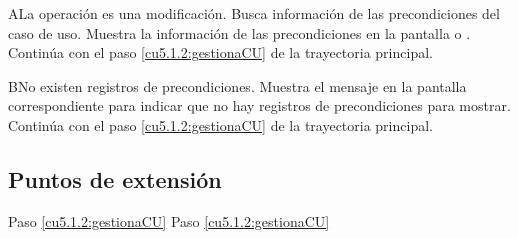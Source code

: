  \begin{UCtrayectoriaA}{A}{La operación es una modificación.}
    \UCpaso[\UCsist] Busca información de las precondiciones del caso de uso. 
    \UCpaso[\UCsist] Muestra la información de las precondiciones en la pantalla  o . 
    \UCpaso[] Continúa con el paso \ref{cu5.1.2:gestionaCU} de la trayectoria principal.
 \end{UCtrayectoriaA}
 
 \begin{UCtrayectoriaA}{B}{No existen registros de precondiciones.}
    \UCpaso[\UCsist] Muestra el mensaje  en la pantalla correspondiente
    para indicar que no hay registros de precondiciones para mostrar.
    \UCpaso[] Continúa con el paso \ref{cu5.1.2:gestionaCU} de la trayectoria principal.
 \end{UCtrayectoriaA}
 

\subsection{Puntos de extensión}

	{Paso \ref{cu5.1.2:gestionaCU}}
	{}
	{Paso \ref{cu5.1.2:gestionaCU}}
	{}
  